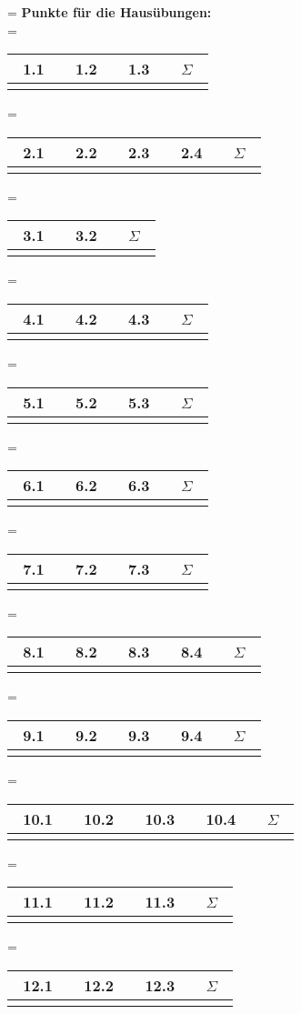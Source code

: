 \documentclass[twoside]{article}
\begin{document}
\begin{center}
	\ifnum\Table=\True
	\textbf{Punkte für die Hausübungen:}\\
	\vspace{1cm}
	\ifnum\ZettelEins=\True
	\begin{tabular}{c|c|c|c}
	~1.1~&~1.2~&~1.3~&~$\Sigma$~	\\	\hline
		 &	   &	 &
	\end{tabular}
	\fi
	\ifnum\ZettelZwei=\True
	\begin{tabular}{c|c|c|c|c}
	~2.1~&~2.2~&~2.3~&~2.4~&~$\Sigma$~	\\	\hline
		 &	   &	 &		&
	\end{tabular}
	\fi
	\ifnum\ZettelDrei=\True
	\begin{tabular}{c|c|c}
	~3.1~&~3.2~&~$\Sigma$~	\\	\hline
		 &	   &
	\end{tabular}
	\fi
	\ifnum\ZettelVier=\True
	\begin{tabular}{c|c|c|c}
	~4.1~&~4.2~&~4.3~&~$\Sigma$~	\\	\hline
		 &	   &	 &
	\end{tabular}
	\fi
	\ifnum\ZettelFuenf=\True
	\begin{tabular}{c|c|c|c}
	~5.1~&~5.2~&~5.3~&~$\Sigma$~	\\	\hline
		 &	   &	 &
	\end{tabular}
	\fi
	\ifnum\ZettelSechs=\True
	\begin{tabular}{c|c|c|c}
	~6.1~&~6.2~&~6.3~&~$\Sigma$~	\\	\hline
		 &	   &	 &
	\end{tabular}
	\fi
	\ifnum\ZettelSieben=\True
	\begin{tabular}{c|c|c|c}
	~7.1~&~7.2~&~7.3~&~$\Sigma$~	\\	\hline
		 &	   &	 &
	\end{tabular}
	\fi
	\ifnum\ZettelAcht=\True
	\begin{tabular}{c|c|c|c|c}
	~8.1~&~8.2~&~8.3~&~8.4~&~$\Sigma$~	\\	\hline
		 &	   &	  &		&
	\end{tabular}
	\fi
	\ifnum\ZettelNeun=\True
	\begin{tabular}{c|c|c|c|c}
	~9.1~&~9.2~&~9.3~&~9.4~&~$\Sigma$~	\\	\hline
		 &	   &	 &		&
	\end{tabular}
	\fi
	\ifnum\ZettelZehn=\True
	\begin{tabular}{c|c|c|c|c}
	~10.1~&~10.2~&~10.3~&~10.4~&~$\Sigma$~	\\	\hline
		 &	   &	 &		&
	\end{tabular}
	\fi
	\ifnum\ZettelElf=\True
	\begin{tabular}{c|c|c|c}
	~11.1~&~11.2~&~11.3~&~$\Sigma$~	\\	\hline
		 &	   &	 &
	\end{tabular}
	\fi
	\ifnum\ZettelZwoelf=\True
	\begin{tabular}{c|c|c|c}
	~12.1~&~12.2~&~12.3~&~$\Sigma$~	\\	\hline
		 &	   &	 &
	\end{tabular}
	\fi
	\fi
	
\end{center}
\newpage
\fi
\end{document}
